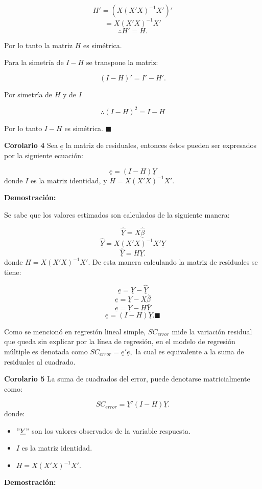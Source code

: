 \documentclass[
  a4paper,
  oneside,
  openany]{book}
\begin{document}
\[H'= (X(X'X)^{-1}X')'\]
\[=X(X'X)^{-1}X'\]
\[\therefore H'= H.\]

Por lo tanto la matriz \(H\) es simétrica.

Para la simetría de \(I-H\) se transpone la matriz:

\[(I-H)'=I'-H'.\]

Por simetría de \(H\) y de \(I\)

\[\therefore (I-H)^2=I-H\]

Por lo tanto \(I-H\) es simétrica. \(\blacksquare\)

\textbf{Corolario 4} Sea \(\underline{e}\) la matriz de residuales, entonces éstos pueden ser expresados por la siguiente ecuación:

\[\underline{e}=(I-H)\underline{Y}\]
donde \(I\) es la matriz identidad, y \(H=X(X'X)^{-1}X'.\)

\textbf{Demostración:}

Se sabe que los valores estimados son calculados de la siguiente manera:

\[\underline{\hat{Y}}=X\underline{\hat{\beta}}\]
\[\underline{\hat{Y}}=X(X'X)^{-1}X'\underline{Y}\]
\[\underline{\hat{Y}}=H\underline{Y}.\]
donde \(H=X(X'X)^{-1}X'.\) De esta manera calculando la matriz de residuales se tiene:

\[\underline{e}=\underline{Y}-\underline{\hat{Y}}\]
\[\underline{e}=\underline{Y}-X\underline{\hat{\beta}}\]
\[\underline{e}=\underline{Y}-H\underline{Y}\]
\[\underline{e}=(I-H)\underline{Y}.\blacksquare\]

Como se mencionó en regresión lineal simple, \(SC_{error}\) mide la variación residual que queda sin explicar por la línea de regresión, en el modelo de regresión múltiple es denotada como \(SC_{error}=\underline{e}'\underline{e},\) la cual es equivalente a la suma de residuales al cuadrado.

\textbf{Corolario 5} La suma de cuadrados del error, puede denotarse matricialmente como:

\[SC_{error}=\underline{Y}'(I-H)\underline{Y}.\]
donde:

\begin{itemize}
\item
  \("\underline{Y}"\) son los valores observados de la variable respuesta.
\item
  \(I\) es la matriz identidad.
\item
  \(H=X(X'X)^{-1}X'.\)
\end{itemize}

\textbf{Demostración:}
\end{document}
